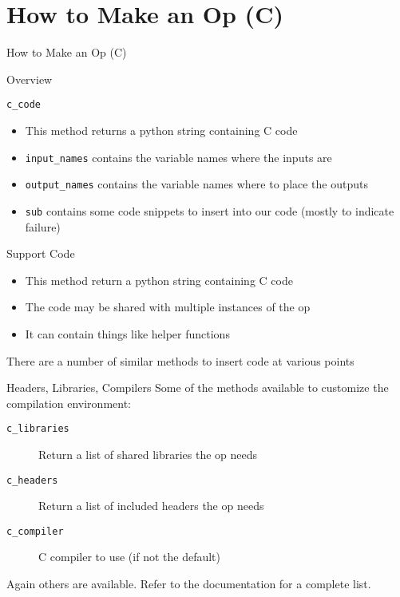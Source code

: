 \documentclass[utf8x]{beamer}
\newcommand{\code}[1]{\lstinline[emph={[2]}]|#1|}
\begin{document}
\section{How to Make an Op (C)}

\begin{frame}[plain]{}
\begin{center}
\Huge How to Make an Op (C)
\end{center}
\end{frame}

\begin{frame}{Overview}

\end{frame}

\begin{frame}{\code{c_code}}

\begin{itemize}
\item This method returns a python string containing C code
\item \code{input_names} contains the variable names where the inputs are
\item \code{output_names} contains the variable names where to place the outputs
\item \code{sub} contains some code snippets to insert into our code (mostly to indicate failure)
\end{itemize}
\end{frame}

\begin{frame}{Support Code}

\begin{itemize}
\item This method return a python string containing C code
\item The code may be shared with multiple instances of the op
\item It can contain things like helper functions
\end{itemize}
There are a number of similar methods to insert code at various points
\end{frame}

\begin{frame}{Headers, Libraries, Compilers}
Some of the methods available to customize the compilation environment:
\begin{description}
\item[\texttt{c\_libraries}] Return a list of shared libraries the op needs
\item[\texttt{c\_headers}] Return a list of included headers the op needs
\item[\texttt{c\_compiler}] C compiler to use (if not the default)
\end{description}
Again others are available.  Refer to the documentation for a complete list.
\end{frame}
\end{document}
